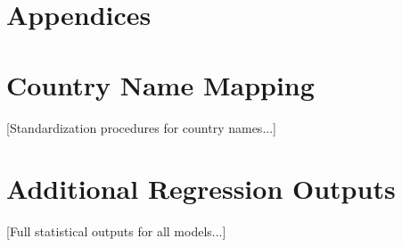 \documentclass[11pt,twoside]{article}
\numberwithin{Theorem}{section}
\numberwithin{Definition}{section}
\numberwithin{Lemma}{section}
\numberwithin{Algorithm}{section}
\numberwithin{equation}{section}
\begin{document}



\label{subsec:model_structure}

\appendix
\section*{Appendices}

\section{Country Name Mapping}
\label{app:one}
[Standardization procedures for country names...]

\section{Additional Regression Outputs}
\label{app:two}
[Full statistical outputs for all models...]
\end{document}
